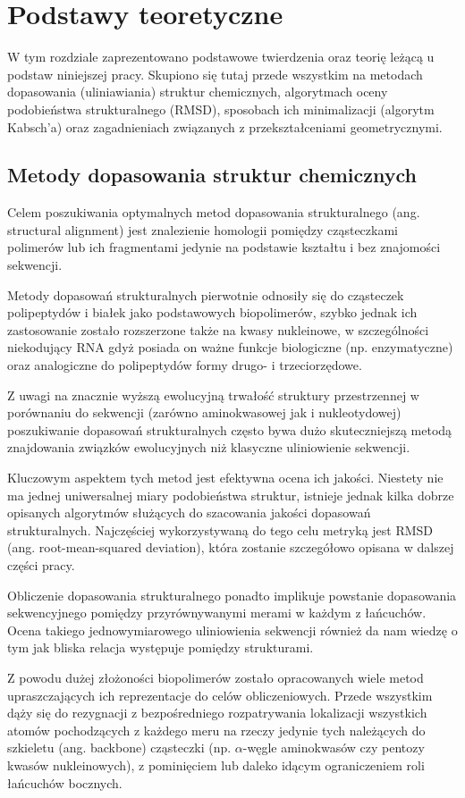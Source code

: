 \documentclass[licencjacka]{pracamgr}
\begin{document}
\chapter{Podstawy teoretyczne}
W tym rozdziale zaprezentowano podstawowe twierdzenia oraz teorię leżącą u podstaw niniejszej pracy. Skupiono się tutaj przede wszystkim na metodach dopasowania (uliniawiania) struktur chemicznych, algorytmach oceny podobieństwa strukturalnego (RMSD), sposobach ich minimalizacji (algorytm Kabsch'a) oraz zagadnieniach związanych z przekształceniami geometrycznymi.

\section{Metody dopasowania struktur chemicznych}
Celem poszukiwania optymalnych metod dopasowania strukturalnego (ang. structural alignment) jest znalezienie homologii pomiędzy cząsteczkami polimerów lub ich fragmentami jedynie na podstawie kształtu i bez znajomości sekwencji. 

Metody dopasowań strukturalnych pierwotnie odnosiły się do cząsteczek polipeptydów i białek jako podstawowych biopolimerów, szybko jednak ich zastosowanie zostało rozszerzone także na kwasy nukleinowe, w szczególności niekodujący RNA gdyż posiada on ważne funkcje biologiczne (np. enzymatyczne) oraz analogiczne do polipeptydów formy drugo- i trzeciorzędowe. 

Z uwagi na znacznie wyższą ewolucyjną trwałość struktury przestrzennej w porównaniu do sekwencji (zarówno aminokwasowej jak i nukleotydowej) poszukiwanie dopasowań strukturalnych często bywa dużo skuteczniejszą metodą znajdowania związków ewolucyjnych niż klasyczne uliniowienie sekwencji. 

Kluczowym aspektem tych metod jest efektywna ocena ich jakości. Niestety nie ma jednej uniwersalnej miary podobieństwa struktur,  istnieje jednak kilka dobrze opisanych algorytmów służących do szacowania jakości dopasowań strukturalnych. Najczęściej wykorzystywaną do tego celu metryką jest RMSD (ang. root-mean-squared deviation), która zostanie szczegółowo opisana w dalszej części pracy.

Obliczenie dopasowania strukturalnego ponadto implikuje powstanie dopasowania sekwencyjnego pomiędzy przyrównywanymi merami w każdym z łańcuchów. Ocena takiego jednowymiarowego uliniowienia sekwencji również da nam wiedzę o tym jak bliska relacja występuje pomiędzy strukturami.

Z powodu dużej złożoności biopolimerów zostało opracowanych wiele metod upraszczających ich reprezentacje do celów obliczeniowych. Przede wszystkim dąży się do rezygnacji z bezpośredniego rozpatrywania lokalizacji wszystkich atomów pochodzących z każdego meru na rzeczy jedynie tych należących do szkieletu (ang. backbone) cząsteczki (np. $\alpha$-węgle aminokwasów czy pentozy kwasów nukleinowych), z pominięciem lub daleko idącym ograniczeniem roli łańcuchów bocznych.
\end{document}
